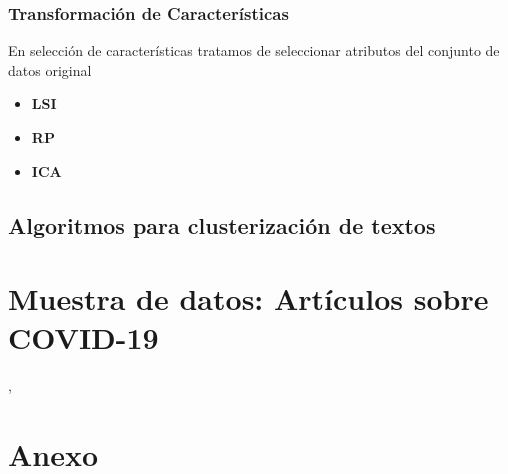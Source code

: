 \documentclass[10pt, a4paper]{article}
\begin{document}
\subsubsection{Transformación de Características}

En selección de características tratamos de seleccionar atributos del conjunto de datos original

\begin{itemize}
  \item \textbf{LSI}
  
  \item \textbf{RP}
  
  \item \textbf{ICA}
\end{itemize}




\subsection{Algoritmos para clusterización de textos}



 
 
\section{Muestra de datos: Artículos sobre COVID-19},




\clearpage

\section{Anexo}

\renewcommand{\listalgorithmcfname}{\subsection{\textbf{Algoritmos}}}
\listofalgorithms
\end{document}
